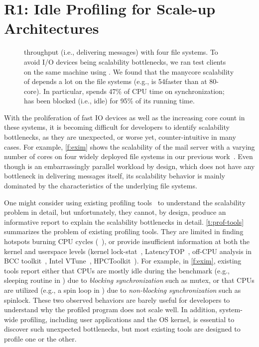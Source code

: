 \section{R1: Idle Profiling for Scale-up Architectures}
\label{sec:idleprofile}

\begin{figure}[t]
\centering

\caption{
  \exim throughput (i.e., delivering messages)
  with four file systems.
  To avoid I/O devices being scalability bottlenecks, we ran test
  clients on the same machine using \mem.
  We found that the manycore scalability of \exim
  depends a lot on the file systems
  (e.g., \ext is 54\x faster than \btrfs at 80-core).
  In particular, \btrfs spends 47\% of CPU time on synchronization;
  \ffs has been blocked (i.e., idle) for 95\% of its running time.
}
\label{f:exim}
\vspace{-5px}
\end{figure}

With the proliferation of fast IO devices as well as the increasing
core count in these systems, it is becoming difficult for developers
to identify scalability bottlenecks, as they are unexpected,
or worse yet, counter-intuitive in many cases.
%
For example, \autoref{f:exim} shows the scalability of the \exim mail
server with a varying number of cores on four widely deployed
file systems in our previous work~\cite{min:fxmark}.
%
Even though \exim is an embarrassingly parallel workload by design,
which does not have any bottleneck in delivering messages itself,
its scalability behavior is mainly dominated
by the characteristics of the underlying file systems.

One might consider using existing profiling tools~\cite{perflinux:web,
  lockstat:web, latencytop:web, bcc:web, vtune:web,
  hpctoolkit:ppopp10, hpctoolkit:web}
to understand the scalability problem in detail,
but unfortunately,
they cannot, by design,
produce an informative report
to explain the scalability bottlenecks in detail.
%
\autoref{t:prof-tools} summarizes the problem of existing profiling tools.
They are
limited in finding hotspots burning CPU cycles (\perf~\cite{perflinux:web}),
or provide insufficient information at both the kernel and userspace levels
(kernel lock-stat~\cite{lockstat:web}, LatencyTOP~\cite{latencytop:web},
off-CPU analysis in BCC toolkit~\cite{bcc:web},
Intel VTune~\cite{vtune:web},
HPCToolkit~\cite{hpctoolkit:ppopp10, hpctoolkit:web}).
%
For example, in \autoref{f:exim},
existing tools report either that CPUs are mostly idle during the benchmark
(e.g., sleeping routine in \ffs)
due to {\em blocking synchronization} such as mutex,
or that CPUs are utilized
(e.g., a spin loop in \btrfs)
due to {\em non-blocking synchronization} such as spinlock.
%
These two observed behaviors are barely useful for
developers to understand
why the profiled program does not scale well.
%
In addition, system-wide profiling, including user applications and
the OS kernel, is essential to discover such unexpected bottlenecks, but most
existing tools are designed to profile one or the other.


